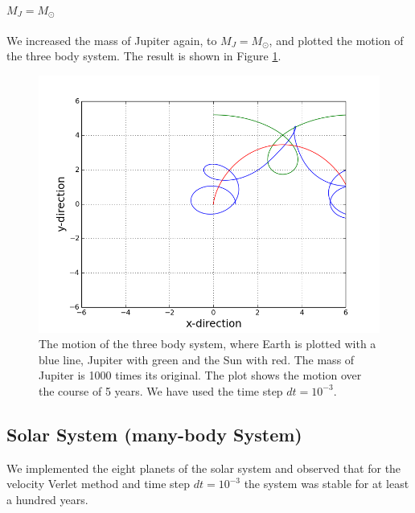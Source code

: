 \documentclass[norsk,a4paper,12pt]{article}
\begin{document}
{\paragraph{\textbf{$M_J = M_{\odot}$}}

We increased the mass of Jupiter again, to $M_J = M_{\odot}$, and plotted the motion of the three body system. The result is shown in Figure \ref{fig:Jupiter_m=1_Earth}.

\begin{figure} [H]
    \centering
    \includegraphics[scale=0.6]{oppg_3e_threebody_Jupiter_m=1_Earth}
    \caption{The motion of the three body system, where Earth is plotted with a blue line, Jupiter with green and the Sun with red. The mass of Jupiter is 1000 times its original. The plot shows the motion over the course of 5 years. We have used the time step $dt = 10^{-3}$.}
    \label{fig:Jupiter_m=1_Earth}
\end{figure}

\subsection{Solar System (many-body System)}
We implemented the eight planets of the solar system and observed that for the velocity Verlet method and time step $dt=10^{-3}$ the system was stable for at least a hundred years. 

}
\end{document}
